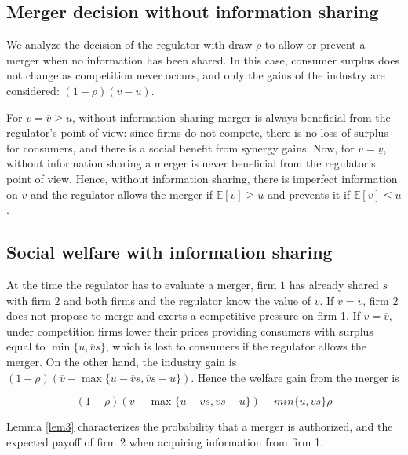 \documentclass[a4paper,leqno]{article}%
\newcommand{\E}{\mathbb E}
\newcommand{\uv}{\underline{v}}
\newcommand{\ov}{\overline{v}}
\begin{document}
\medskip


\subsection{Merger decision without information sharing}

We analyze the decision of the regulator with draw $\rho$ to allow or prevent a merger when no information has been shared. In this case, consumer surplus does not change as competition never occurs, and only the gains of the industry are considered: $(1-\rho) (v-u)$.

For $v=\ov\geq u$, without information sharing merger is always beneficial from the regulator's point of view: since firms do not compete, there is no loss of surplus for consumers, and there is a social benefit from synergy gains. Now, for $v=\uv$, without information sharing a merger is never beneficial from the regulator's point of view. Hence, without information sharing, there is imperfect information on $v$ and the regulator allows the merger if $\E[v]\geq u$ and prevents it if $\E[v]\leq u$.

\medskip

\subsection{Social welfare with information sharing}

\medskip

At the time the regulator has to evaluate a merger, firm $1$ has already shared $s$ with firm $2$ and both firms and the regulator know the value of $v$. If $v=\uv$, firm 2 does not propose to merge and exerts a competitive pressure on firm 1. If $v=\ov$, under competition firms lower their prices providing consumers with surplus equal to $\min\{u,\ov s\}$, which is lost to consumers if the regulator allows the merger. On the other hand, the industry gain is $(1-\rho) (\ov-\max\{u-\ov s,\ov s-u\})$. Hence the welfare gain from the merger is

%

\[
(1-\rho) (\ov-\max\{u-\ov s,\ov s-u\})-min\{u,\ov s\}\rho
\]

Lemma \ref{lem3} characterizes the probability that a merger is authorized, and the expected payoff of firm 2 when acquiring information from firm 1.
\end{document}
